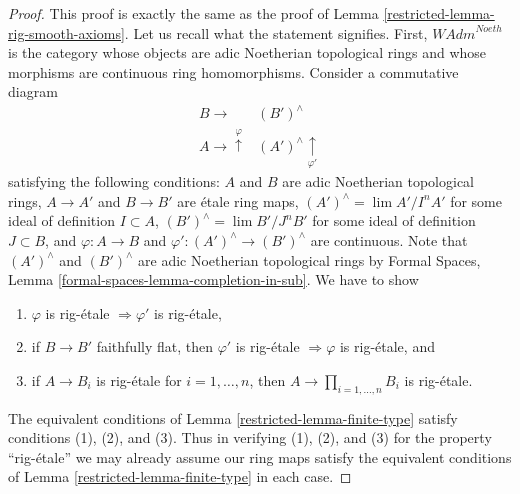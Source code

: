 \begin{proof}

This proof is exactly the same as the proof of
Lemma \ref{restricted-lemma-rig-smooth-axioms}.
Let us recall what the statement signifies. First,
$\textit{WAdm}^{Noeth}$ is the category whose objects are
adic Noetherian topological rings and whose morphisms are
continuous ring homomorphisms. Consider a commutative diagram
$$
\begin{array}{cc}B \longrightarrow & (B')^\wedge \\ A \longrightarrow\overset{\varphi}{\uparrow} & (A')^\wedge \underset{\varphi'}{\uparrow}\end{array}
$$
satisfying the following conditions:
$A$ and $B$ are adic Noetherian topological rings,
$A \to A'$ and $B \to B'$ are \'etale ring maps,
$(A')^\wedge = \lim A'/I^nA'$ for some ideal of definition $I \subset A$,
$(B')^\wedge = \lim B'/J^nB'$ for some ideal of definition $J \subset B$, and
$\varphi : A \to B$ and $\varphi' : (A')^\wedge \to (B')^\wedge$
are continuous. Note that $(A')^\wedge$ and $(B')^\wedge$ are
adic Noetherian topological rings by
Formal Spaces, Lemma \ref{formal-spaces-lemma-completion-in-sub}.
We have to show
\begin{enumerate}
\item $\varphi$ is rig-\'etale $\Rightarrow \varphi'$ is rig-\'etale,
\item if $B \to B'$ faithfully flat, then $\varphi'$ is rig-\'etale
$\Rightarrow \varphi$ is rig-\'etale, and
\item if $A \to B_i$ is rig-\'etale for $i = 1, \ldots, n$, then
$A \to \prod_{i = 1, \ldots, n} B_i$ is rig-\'etale.
\end{enumerate}
The equivalent conditions of Lemma \ref{restricted-lemma-finite-type} satisfy
conditions (1), (2), and (3).
Thus in verifying (1), (2), and (3) for the property
``rig-\'etale'' we may already assume our ring maps satisfy
the equivalent conditions of Lemma \ref{restricted-lemma-finite-type}
in each case.


\end{proof}

